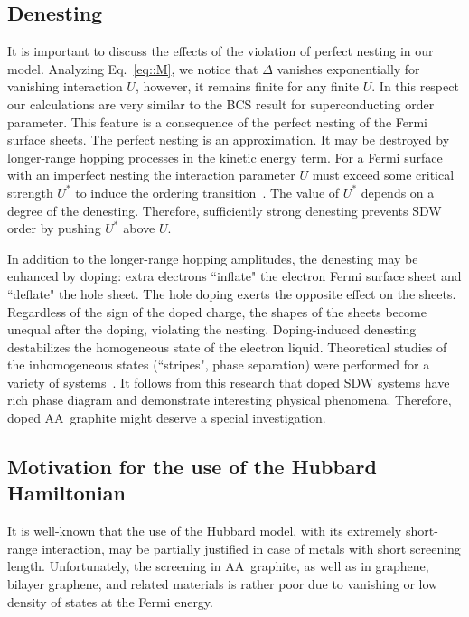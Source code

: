 \documentclass[prb,twocolumn,showpacs,aps,superscriptaddress,floatfix]{revtex4}
\begin{document}
\subsection{Denesting}

It is important to discuss the effects of the violation of perfect nesting
in our model. Analyzing
Eq.~\eqref{eq::M},
we notice that $\Delta$ vanishes exponentially for vanishing interaction
$U$, however, it remains finite for any finite $U$. In this respect our
calculations are very similar to the BCS result for superconducting order
parameter. This feature is a consequence of the perfect nesting of the
Fermi surface sheets. The perfect nesting is an approximation. It may be
destroyed by longer-range hopping processes in the kinetic energy term. For
a Fermi surface with an imperfect nesting the interaction parameter $U$
must exceed some critical strength
$U^*$
to induce the ordering
transition~\cite{OurPnics2013}.
The value of
$U^*$
depends on a degree of the denesting. Therefore, sufficiently strong
denesting prevents SDW order by pushing
$U^*$
above $U$.

In addition to the longer-range hopping amplitudes, the denesting may be
enhanced by doping: extra electrons ``inflate" the electron Fermi surface
sheet and ``deflate" the hole sheet. The hole doping exerts the opposite
effect on the sheets. Regardless of the sign of the doped charge, the
shapes of the sheets become unequal after the doping, violating the nesting.
Doping-induced denesting destabilizes the homogeneous state of the electron
liquid. Theoretical studies of the inhomogeneous states (``stripes", phase
separation) were performed for a variety of
systems~\cite{zaanen_stripes1989,tokatly1992,fflo4,spinstate2009,teitel2010,
IrkhinPRB2010,We_grA_grE2012,PrbOur,WeImperf,bianconi2015intrinsic,prb_sl2017,
half_met_prl2017,rakhmanov2017inhomogeneous}.
It follows from this research that doped SDW systems have rich phase
diagram and demonstrate interesting physical phenomena. Therefore, doped
AA~graphite might deserve a special investigation.

\subsection{Motivation for the use of the Hubbard Hamiltonian}

It is well-known that the use of the Hubbard model, with its extremely
short-range interaction, may be partially justified in case of metals with
short screening length. Unfortunately, the screening in AA~graphite, as
well as in graphene, bilayer graphene, and related materials is rather poor
due to vanishing or low density of states at the Fermi energy.
\end{document}
